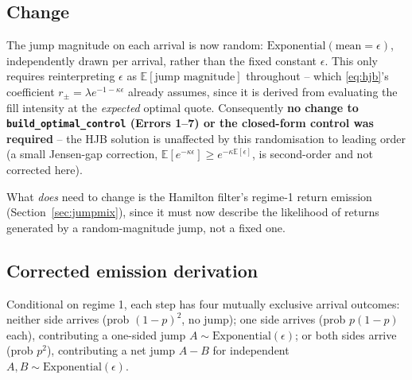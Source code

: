 \documentclass[11pt]{article}
\newcommand{\E}{\mathbb{E}}
\begin{document}
\subsection{Change}
The jump magnitude on each arrival is now random: $\mathrm{Exponential}(\text{mean}=\epsilon)$, independently drawn per arrival, rather than the fixed constant $\epsilon$. This only requires reinterpreting $\epsilon$ as $\E[\text{jump magnitude}]$ throughout -- which \eqref{eq:hjb}'s coefficient $r_\pm = \lambda e^{-1-\kappa\epsilon}$ already assumes, since it is derived from evaluating the fill intensity at the \emph{expected} optimal quote. Consequently \textbf{no change to \texttt{build\_optimal\_control} (Errors 1--7) or the closed-form control was required} -- the HJB solution is unaffected by this randomisation to leading order (a small Jensen-gap correction, $\E[e^{-\kappa\epsilon}]\ge e^{-\kappa\E[\epsilon]}$, is second-order and not corrected here).

What \emph{does} need to change is the Hamilton filter's regime-1 return emission (Section~\ref{sec:jumpmix}), since it must now describe the likelihood of returns generated by a random-magnitude jump, not a fixed one.

\subsection{Corrected emission derivation}
Conditional on regime 1, each step has four mutually exclusive arrival outcomes: neither side arrives (prob $(1-p)^2$, no jump); one side arrives (prob $p(1-p)$ each), contributing a one-sided jump $A\sim\mathrm{Exponential}(\epsilon)$; or both sides arrive (prob $p^2$), contributing a net jump $A-B$ for independent $A,B\sim\mathrm{Exponential}(\epsilon)$.
\end{document}
